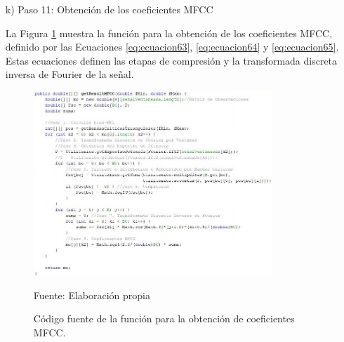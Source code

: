 \begin{enumerate}
\item[k)]Paso 11: Obtención de los coeficientes MFCC
\par
La Figura \ref{fig:figura3.26} muestra la función para la obtención de los coeficientes MFCC, definido por las Ecuaciones \eqref{eq:ecuacion63}, \eqref{eq:ecuacion64} y \eqref{eq:ecuacion65}. Estas ecuaciones definen las etapas de compresión y la transformada discreta inversa de Fourier de la señal.
\begin{figure}[H]
\captionsetup{justification=centering}
\begin{center}
\includegraphics[width=0.85\textwidth]{Imagenes/Cap3/image026}
\end{center}
\begin{center}
\vskip -0.5cm
\caption{\small{Código fuente de la función para la obtención de coeficientes MFCC.}}
\label{fig:figura3.26}
{\small{Fuente: Elaboración propia}}
\end{center}
\end{figure}


\end{enumerate}
